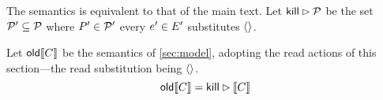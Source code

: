 The semantics is equivalent to that of the main text.
Let $\mathsf{kill}\mathbin\rhd\mathcal{P}$ be the set $\mathcal{P}'\subseteq\mathcal{P}$ where $P'\in\mathcal{P}'$
every $e'\in E'$ substitutes $\langle\rangle$.

\begin{proposition}
  \label{thm:seq}
  Let $\semold{\aCmd}$ be the semantics of \textsection\ref{sec:model},
  adopting the read actions of this section---the read substitution
  being $\langle\rangle$.
\begin{displaymath}
  \semold{\aCmd} = \killS\sem{\aCmd}
\end{displaymath}
\end{proposition}








